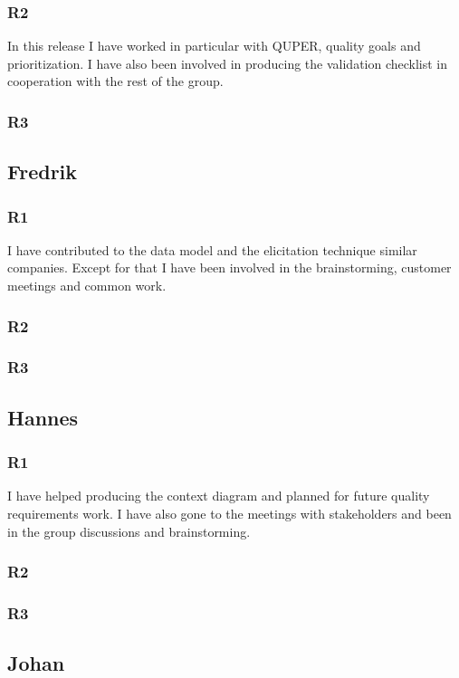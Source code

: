 \documentclass[a4paper]{article}
\begin{document}
    \subsubsection{R2}
	In this release I have worked in particular with QUPER, quality goals and prioritization. I have also been involved in producing the validation checklist in cooperation with the rest of the group.
    \subsubsection{R3}
	
  \subsection{Fredrik}
    \subsubsection{R1}
    I have contributed to the data model and the elicitation technique similar companies. Except for that I have been involved in the brainstorming, customer meetings and common work.
    \subsubsection{R2}
    \subsubsection{R3}
  	
  \subsection{Hannes}
    \subsubsection{R1}
    I have helped producing the context diagram and planned for future quality requirements work. I have also gone to the meetings with stakeholders and been in the group discussions and brainstorming.
    \subsubsection{R2}
    \subsubsection{R3}
  
  \subsection{Johan}
\end{document}
